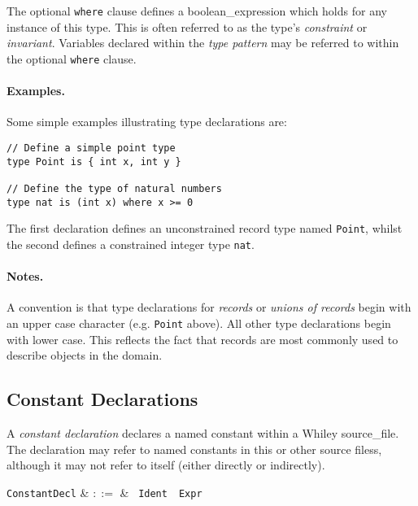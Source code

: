 The optional \lstinline{where} clause defines a
\gls{boolean_expression} which holds for any instance of this type.
This is often referred to as the type's {\em constraint} or {\em
  invariant}.  Variables declared within the {\em type pattern} may be
referred to within the optional \lstinline{where} clause.

\paragraph{Examples.}  Some simple examples illustrating type
declarations are:

\begin{lstlisting}
// Define a simple point type
type Point is { int x, int y }

// Define the type of natural numbers
type nat is (int x) where x >= 0
\end{lstlisting}

The first declaration defines an unconstrained record type named
\lstinline{Point}, whilst the second defines a constrained integer
type \lstinline{nat}.

\paragraph{Notes.}  A convention is that type declarations for {\em
  records} or {\em unions of records} begin with an upper case
character (e.g. \lstinline{Point} above).  All other type declarations
begin with lower case.  This reflects the fact that records are most
commonly used to describe objects in the domain.


\subsection{Constant Declarations}

A {\em constant declaration} declares a named constant within a Whiley
\gls{source_file}.  The declaration may refer to named constants in this
or other source filess, although it may not refer to itself (either
directly or indirectly).

\begin{syntax}
  \verb+ConstantDecl+ & $::=$ & \ \verb+Ident+\
  \ \verb+Expr+\\
\end{syntax}

